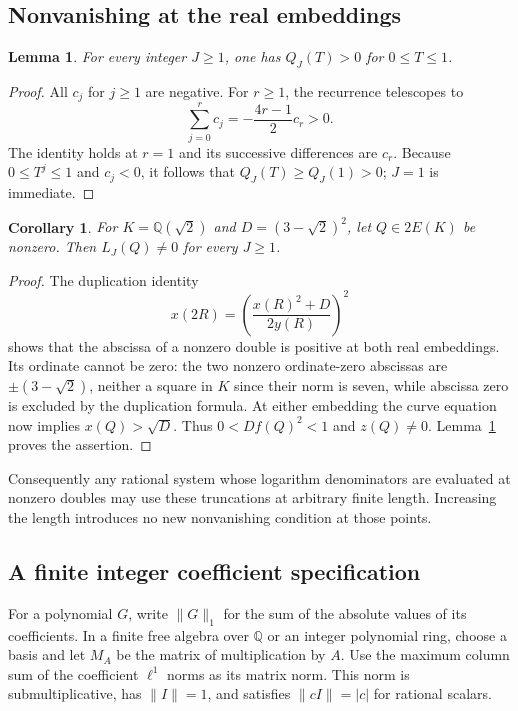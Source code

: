 \documentclass[11pt,a4paper]{article}
\newtheorem{lemma}[theorem]{Lemma}
\newtheorem{corollary}[theorem]{Corollary}
\theoremstyle{definition}\newtheorem{definition}[theorem]{Definition}
\newcommand{\Q}{\mathbb Q}\newcommand{\Z}{\mathbb Z}
\begin{document}
\subsection{Nonvanishing at the real embeddings}

\begin{lemma}\label{lem:positive-logarithm-polynomial}
For every integer $J\ge1$, one has $Q_J(T)>0$ for $0\le T\le1$.
\end{lemma}
\begin{proof}
All $c_j$ for $j\ge1$ are negative. For $r\ge1$, the recurrence
telescopes to
\[
                    \sum_{j=0}^{r}c_j=-\frac{4r-1}{2}c_r>0.
\]
The identity holds at $r=1$ and its successive differences are $c_r$.
Because $0\le T^j\le1$ and $c_j<0$, it follows that
$Q_J(T)\ge Q_J(1)>0$; $J=1$ is immediate.
\end{proof}

\begin{corollary}\label{cor:nonzero-logarithm-denominator}
For $K=\Q(\sqrt2)$ and $D=(3-\sqrt2)^2$, let $Q\in2E(K)$
be nonzero. Then $L_J(Q)\ne0$ for every $J\ge1$.
\end{corollary}
\begin{proof}
The duplication identity
\[
                x(2R)=\left(\frac{x(R)^2+D}{2y(R)}\right)^2
\]
shows that the abscissa of a nonzero double is positive at both real
embeddings. Its ordinate cannot be zero: the two nonzero
ordinate-zero abscissas are $\pm(3-\sqrt2)$, neither a square in $K$
since their norm is seven, while abscissa zero is excluded by the
duplication formula. At either embedding the curve equation now
implies $x(Q)>\sqrt D$. Thus $0<Df(Q)^2<1$ and $z(Q)\ne0$.
Lemma~\ref{lem:positive-logarithm-polynomial} proves the assertion.
\end{proof}

Consequently any rational system whose logarithm denominators are
evaluated at nonzero doubles may use these truncations at arbitrary
finite length. Increasing the length introduces no new
nonvanishing condition at those points.

\subsection{A finite integer coefficient specification}

For a polynomial $G$, write $\|G\|_1$ for the sum of the absolute
values of its coefficients. In a finite free algebra over $\mathbb Q$
or an integer polynomial ring, choose a basis and let $M_A$ be the
matrix of multiplication by $A$. Use the maximum column sum of the
coefficient $\ell^1$ norms as its matrix norm. This norm is
submultiplicative, has $\|I\|=1$, and satisfies $\|cI\|=|c|$ for
rational scalars.
\end{document}
